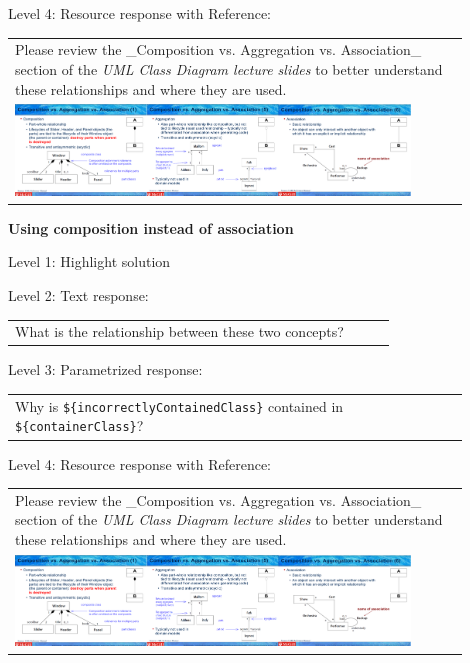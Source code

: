 \noindent Level 4: Resource response with Reference: \medskip

\begin{tabular}{|p{0.9\linewidth}}
Please review the _Composition vs. Aggregation vs. Association_ section of 
the \textit{UML Class Diagram lecture slides} to 
better understand these relationships and where they are used.

\\
\includegraphics[width=0.9\textwidth]{images/composition_aggregation_association.png}
\end{tabular} \medskip


\noindent \textbf{Using composition instead of association} \medskip

\noindent Level 1: Highlight solution \medskip

\noindent Level 2: Text response: \medskip

\begin{tabular}{|p{0.9\linewidth}}
What is the relationship between these two concepts?
\end{tabular} \medskip

\noindent Level 3: Parametrized response: \medskip

\begin{tabular}{|p{0.9\linewidth}}
Why is \verb|${incorrectlyContainedClass}| contained in \verb|${containerClass}|?
\end{tabular} \medskip

\noindent Level 4: Resource response with Reference: \medskip

\begin{tabular}{|p{0.9\linewidth}}
Please review the _Composition vs. Aggregation vs. Association_ section of 
the \textit{UML Class Diagram lecture slides} to 
better understand these relationships and where they are used.

\\
\includegraphics[width=0.9\textwidth]{images/composition_aggregation_association.png}
\end{tabular} \medskip


